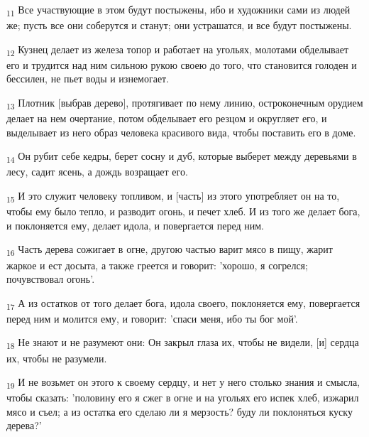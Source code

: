 \begin{tcolorbox}
\textsubscript{11} Все участвующие в этом будут постыжены, ибо и художники сами из людей же; пусть все они соберутся и станут; они устрашатся, и все будут постыжены.
\end{tcolorbox}
\begin{tcolorbox}
\textsubscript{12} Кузнец делает из железа топор и работает на угольях, молотами обделывает его и трудится над ним сильною рукою своею до того, что становится голоден и бессилен, не пьет воды и изнемогает.
\end{tcolorbox}
\begin{tcolorbox}
\textsubscript{13} Плотник [выбрав дерево], протягивает по нему линию, остроконечным орудием делает на нем очертание, потом обделывает его резцом и округляет его, и выделывает из него образ человека красивого вида, чтобы поставить его в доме.
\end{tcolorbox}
\begin{tcolorbox}
\textsubscript{14} Он рубит себе кедры, берет сосну и дуб, которые выберет между деревьями в лесу, садит ясень, а дождь возращает его.
\end{tcolorbox}
\begin{tcolorbox}
\textsubscript{15} И это служит человеку топливом, и [часть] из этого употребляет он на то, чтобы ему было тепло, и разводит огонь, и печет хлеб. И из того же делает бога, и поклоняется ему, делает идола, и повергается перед ним.
\end{tcolorbox}
\begin{tcolorbox}
\textsubscript{16} Часть дерева сожигает в огне, другою частью варит мясо в пищу, жарит жаркое и ест досыта, а также греется и говорит: 'хорошо, я согрелся; почувствовал огонь'.
\end{tcolorbox}
\begin{tcolorbox}
\textsubscript{17} А из остатков от того делает бога, идола своего, поклоняется ему, повергается перед ним и молится ему, и говорит: 'спаси меня, ибо ты бог мой'.
\end{tcolorbox}
\begin{tcolorbox}
\textsubscript{18} Не знают и не разумеют они: Он закрыл глаза их, чтобы не видели, [и] сердца их, чтобы не разумели.
\end{tcolorbox}
\begin{tcolorbox}
\textsubscript{19} И не возьмет он этого к своему сердцу, и нет у него столько знания и смысла, чтобы сказать: 'половину его я сжег в огне и на угольях его испек хлеб, изжарил мясо и съел; а из остатка его сделаю ли я мерзость? буду ли поклоняться куску дерева?'
\end{tcolorbox}
